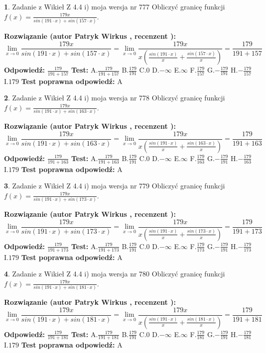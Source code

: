 \documentclass[12pt, a4paper]{article}
\theoremstyle{definition} %
\newtheorem{zad}{}
\newcommand{\zadStart}[1]{\begin{zad}#1\newline}
\newcommand{\zadStop}{\end{zad}}
\newcommand{\rozwStart}[2]{\noindent \textbf{Rozwiązanie (autor #1 , recenzent #2): }\newline}
\newcommand{\rozwStop}{\newline}
\newcommand{\odpStart}{\noindent \textbf{Odpowiedź:}\newline}
\newcommand{\odpStop}{\newline}
\newcommand{\testStart}{\noindent \textbf{Test:}\newline}
\newcommand{\testStop}{\newline}
\newcommand{\kluczStart}{\noindent \textbf{Test poprawna odpowiedź:}\newline}
\newcommand{\kluczStop}{\newline}
\begin{document}
\zadStart{Zadanie z Wikieł Z 4.4 i) moja wersja nr 777}
Obliczyć granicę funkcji $f(x)=\frac{179x}{sin(191\cdot x) +sin(157\cdot x)}$.
\zadStop
\rozwStart{Patryk Wirkus}{}
$$\lim\limits_{x\to 0}\frac{179x}{sin(191\cdot x) +sin(157\cdot x)}=\lim\limits_{x\to 0}\frac{179x}{x(\frac{sin(191\cdot x)}{x}+\frac{sin(157\cdot x)}{x})}=\frac{179}{191+157}$$
\rozwStop
\odpStart
$\frac{179}{191+157}$
\odpStop
\testStart
A.$\frac{179}{191+157}$
B.$\frac{179}{191}$
C.$0$
D.$-\infty$
E.$\infty$
F.$\frac{179}{157}$
G.$-\frac{179}{191}$
H.$-\frac{179}{157}$
I.$179$
\testStop
\kluczStart
A
\kluczStop



\zadStart{Zadanie z Wikieł Z 4.4 i) moja wersja nr 778}
Obliczyć granicę funkcji $f(x)=\frac{179x}{sin(191\cdot x) +sin(163\cdot x)}$.
\zadStop
\rozwStart{Patryk Wirkus}{}
$$\lim\limits_{x\to 0}\frac{179x}{sin(191\cdot x) +sin(163\cdot x)}=\lim\limits_{x\to 0}\frac{179x}{x(\frac{sin(191\cdot x)}{x}+\frac{sin(163\cdot x)}{x})}=\frac{179}{191+163}$$
\rozwStop
\odpStart
$\frac{179}{191+163}$
\odpStop
\testStart
A.$\frac{179}{191+163}$
B.$\frac{179}{191}$
C.$0$
D.$-\infty$
E.$\infty$
F.$\frac{179}{163}$
G.$-\frac{179}{191}$
H.$-\frac{179}{163}$
I.$179$
\testStop
\kluczStart
A
\kluczStop



\zadStart{Zadanie z Wikieł Z 4.4 i) moja wersja nr 779}
Obliczyć granicę funkcji $f(x)=\frac{179x}{sin(191\cdot x) +sin(173\cdot x)}$.
\zadStop
\rozwStart{Patryk Wirkus}{}
$$\lim\limits_{x\to 0}\frac{179x}{sin(191\cdot x) +sin(173\cdot x)}=\lim\limits_{x\to 0}\frac{179x}{x(\frac{sin(191\cdot x)}{x}+\frac{sin(173\cdot x)}{x})}=\frac{179}{191+173}$$
\rozwStop
\odpStart
$\frac{179}{191+173}$
\odpStop
\testStart
A.$\frac{179}{191+173}$
B.$\frac{179}{191}$
C.$0$
D.$-\infty$
E.$\infty$
F.$\frac{179}{173}$
G.$-\frac{179}{191}$
H.$-\frac{179}{173}$
I.$179$
\testStop
\kluczStart
A
\kluczStop



\zadStart{Zadanie z Wikieł Z 4.4 i) moja wersja nr 780}
Obliczyć granicę funkcji $f(x)=\frac{179x}{sin(191\cdot x) +sin(181\cdot x)}$.
\zadStop
\rozwStart{Patryk Wirkus}{}
$$\lim\limits_{x\to 0}\frac{179x}{sin(191\cdot x) +sin(181\cdot x)}=\lim\limits_{x\to 0}\frac{179x}{x(\frac{sin(191\cdot x)}{x}+\frac{sin(181\cdot x)}{x})}=\frac{179}{191+181}$$
\rozwStop
\odpStart
$\frac{179}{191+181}$
\odpStop
\testStart
A.$\frac{179}{191+181}$
B.$\frac{179}{191}$
C.$0$
D.$-\infty$
E.$\infty$
F.$\frac{179}{181}$
G.$-\frac{179}{191}$
H.$-\frac{179}{181}$
I.$179$
\testStop
\kluczStart
A
\kluczStop
\end{document}
